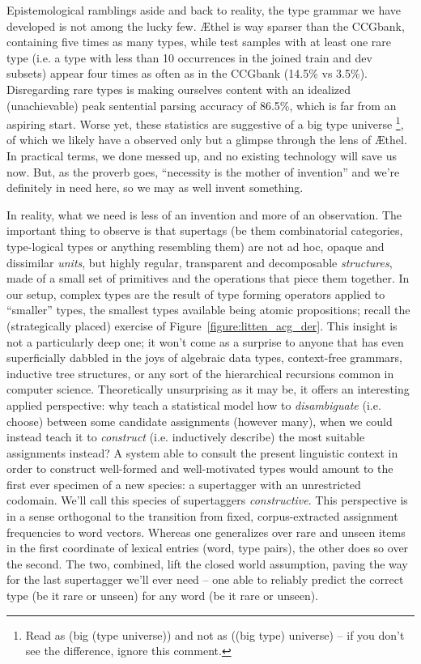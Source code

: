 Epistemological ramblings aside and back to reality, the type grammar we have developed is not among the lucky few.
\AE thel is way sparser than the CCGbank, containing five times as many types, while test samples with at least one rare type (i.e. a type with less than 10 occurrences in the joined train and dev subsets) appear four times as often as in the CCGbank (14.5\% vs 3.5\%).
Disregarding rare types is making ourselves content with an idealized (unachievable) peak sentential parsing accuracy of 86.5\%, which is far from an aspiring start.
Worse yet, these statistics are suggestive of a big type universe%
	\footnote{Read as (big (type universe)) and not as ((big type) universe) -- if you don't see the difference, ignore this comment.}, 
of which we likely have a observed only but a glimpse through the lens of \AE thel.
In practical terms, we done messed up, and no existing technology will save us now.
But, as the proverb goes, ``necessity is the mother of invention'' and we're definitely in need here, so we may as well invent something.

In reality, what we need is less of an invention and more of an observation.
The important thing to observe is that supertags (be them combinatorial categories, type-logical types or anything resembling them) are not ad hoc, opaque and dissimilar \textit{units}, but highly regular, transparent and decomposable \textit{structures}, made of a small set of primitives and the operations that piece them together.
In our setup, complex types are the result of type forming operators applied to ``smaller'' types, the smallest types available being atomic propositions; recall the (strategically placed) exercise of Figure~\ref{figure:litten_acg_der}.
This insight is not a particularly deep one; it won't come as a surprise to anyone that has even superficially dabbled in the joys of algebraic data types, context-free grammars, inductive tree structures, or any sort of the hierarchical recursions common in computer science.
Theoretically unsurprising as it may be, it offers an interesting applied perspective: why teach a statistical model how to \textit{disambiguate} (i.e. choose) between some candidate assignments (however many), when we could instead teach it to \textit{construct} (i.e. inductively describe) the most suitable assignments instead?
A system able to consult the present linguistic context in order to construct well-formed and well-motivated types would amount to the first ever specimen of a new species: a supertagger with an unrestricted codomain.
We'll call this species of supertaggers \textit{constructive}.
This perspective is in a sense orthogonal to the transition from fixed, corpus-extracted assignment frequencies to word vectors. Whereas one generalizes over rare and unseen items in the first coordinate of lexical entries (\textlangle word, type\textrangle{} pairs), the other does so over the second.
The two, combined, lift the closed world assumption, paving the way for the last supertagger we'll ever need -- one able to reliably predict the correct type (be it rare or unseen) for any word (be it rare or unseen).


